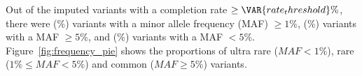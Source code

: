 
Out of the  imputed variants with a completion rate
$\geq \VAR{ rate_threshold }\%$, there were 
(\%) variants with a minor
allele frequency (MAF) $\geq 1\%$, 
(\%) variants with a MAF $\geq 5\%$, and
 (\%) variants with a MAF
$<5\%$.\\
 Figure~\ref{fig:frequency_pie} shows the proportions of ultra rare
($MAF<1\%$), rare ($1\%\leq MAF < 5\%$) and common ($MAF\geq 5\%$) variants.\\


